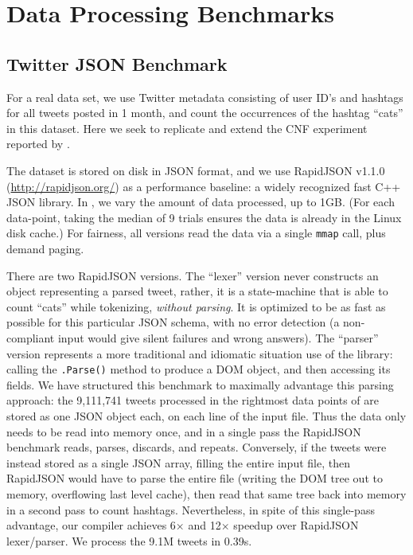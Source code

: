 \documentclass[showabstract,showacknowledgments,showpreface,showdedication]{iuphd}
\theoremstyle{nonumberplain}
\newcommand{\il}[1]{\lstinline[style=inline,mathescape=true];#1;}
\begin{document}
\section{Data Processing Benchmarks}

 

\subsection{Twitter JSON Benchmark}

For a real data set, we
use Twitter metadata consisting of user ID's and hashtags for all tweets posted
in 1 month, and count the occurrences of the hashtag ``cats'' in this dataset.
Here we seek to replicate and extend the CNF experiment reported by
\cite{cnf-icfp15}.

The dataset is stored on disk in JSON format, and we use RapidJSON
v1.1.0 ({\footnotesize\url{http://rapidjson.org/}}) as a performance baseline: a widely
recognized fast C++ JSON library.
%
In , we vary the amount of data processed,
up to 1GB.  (For each data-point, taking the median of 9 trials
ensures the data is already in the Linux disk cache.)
%
For fairness, all versions read the data via a single \il{mmap} call, plus
demand paging.

There are two RapidJSON versions. The ``lexer'' version never constructs an
object representing a parsed tweet, rather, it is a state-machine
that is able to count ``cats'' while tokenizing, {\em without parsing}.  It is
optimized to be as fast as possible for this particular JSON schema, with no
error detection (a non-compliant input would give silent failures and wrong
answers).
%
The ``parser'' version represents a more traditional and idiomatic situation use
of the library: calling the \il{.Parse()} method to produce a DOM object, and
then accessing its fields.
%
We have structured this benchmark to maximally advantage this parsing approach:
the 9,111,741 tweets processed in the rightmost data points of  are stored as one JSON object each, on each line of the input file.
%
Thus the data only needs to be read into memory once, and in a single pass the RapidJSON benchmark reads, parses, discards, and repeats.
%
Conversely, if the tweets were instead stored as a single JSON array, filling
the entire input file, then RapidJSON would have to parse the entire file
(writing the DOM tree out to memory, overflowing last level cache), then read
that same tree back into memory in a second pass to count hashtags.
%
Nevertheless, in spite of this single-pass advantage, our compiler achieves
6$\times$ and 12$\times$ speedup over RapidJSON lexer/parser.
%
We process the 9.1M tweets in 0.39s.
\end{document}
